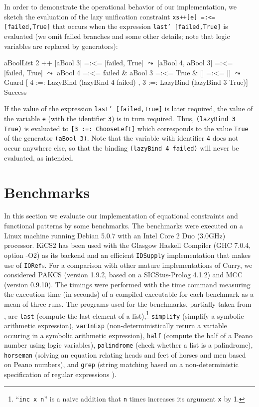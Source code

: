 \documentclass{llncs}
\newcommand{\code}[1]{\mbox{\small\texttt{#1}}}
\newcommand{\ccode}[1]{``\code{#1}''}
\begin{document}
In order to demonstrate the operational behavior of our implementation,
we sketch the evaluation of the lazy unification constraint
\code{xs++[e] =:<= [failed,True]} that occurs when the expression
\code{last' [failed,True]} is evaluated (we omit failed branches
and some other details; note that logic variables are replaced
by generators):
\begin{haskell}
     aBoolList 2 ++ [aBool 3] =:<= [failed, True]
  $\leadsto$ [aBool 4, aBool 3] =:<= [failed, True]
  $\leadsto$ aBool 4 =:<= failed & aBool 3 =:<= True & [] =:<= []
  $\leadsto$ Guard [ 4 :=: LazyBind (lazyBind 4 failed)
           , 3 :=: LazyBind (lazyBind 3 True)] Success
\end{haskell}
If the value of the expression \code{last' [failed,True]} is later required,
the value of the variable \code{e} (with the identifier \code{3}) is in turn
required.
Thus, \code{(lazyBind 3 True)} is evaluated to \code{[3 :=: ChooseLeft]}
which corresponds to the value \code{True} of the generator \code{(aBool 3)}.
Note that the variable with identifier \code{4} does not occur
anywhere else, so that the binding \code{(lazyBind 4 failed)}
will never be evaluated, as intended.


\section{Benchmarks}
\label{sec:Benchmarks}


In this section we evaluate our implementation of
equational constraints and functional patterns by some benchmarks.
The benchmarks were executed on a Linux machine running Debian 5.0.7 with
an Intel Core 2 Duo (3.0GHz) processor.
KiCS2 has been used with
the Glasgow Haskell Compiler (GHC 7.0.4, option -O2) as its backend and
an efficient \code{IDSupply} implementation that makes use of \code{IORef}s.
For a comparison with other mature implementations of Curry,
we considered PAKCS \cite{Hanus10PAKCS}
(version 1.9.2, based on a SICStus-Prolog 4.1.2)
and MCC \cite{Lux99FLOPS} (version 0.9.10). The timings were performed with the
time command measuring the execution time (in seconds) of a compiled
executable for each benchmark as a mean of three runs.
The programs used for the benchmarks,
partially taken from \cite{AntoyHanus05LOPSTR},
are \code{last} (compute the last element of a list),\footnote{%
\ccode{inc x n} is a naive addition that \code{n} times
increases its argument \code{x} by 1.}
\code{simplify} (simplify a symbolic arithmetic expression),
\code{varInExp} (non-deterministically return a variable occuring
                  in a symbolic arithmetic expression),
\code{half} (compute the half of a Peano number using logic variables),
\code{palindrome} (check whether a list is a palindrome),
\code{horseman} (solving an equation relating heads and feet of horses and men
based on Peano numbers),
and
\code{grep} (string matching based on a non-deterministic
specification of regular expressions \cite{AntoyHanus10CACM}).
\end{document}
